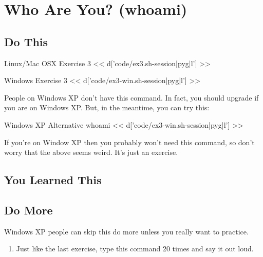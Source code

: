 \chapter{Who Are You? (whoami)}

\section{Do This}

\begin{code}{Linux/Mac OSX Exercise 3}
<< d['code/ex3.sh-session|pyg|l'] >>
\end{code}

\begin{code}{Windows Exercise 3}
<< d['code/ex3-win.sh-session|pyg|l'] >>
\end{code}

People on Windows XP don't have this command.  In fact, you should upgrade
if you are on Windows XP. But, in the meantime, you can try this:

\begin{code}{Windows XP Alternative whoami}
<< d['code/ex3-win.sh-session|pyg|l'] >>
\end{code}

If you're on Window XP then you probably won't need this command, so don't
worry that the above seems weird.  It's just an exercise.

\section{You Learned This}

\section{Do More}

Windows XP people can skip this do more unless you really want to practice.

\begin{enumerate}
\item Just like the last exercise, type this command 20 times and say it out loud.
\end{enumerate}

